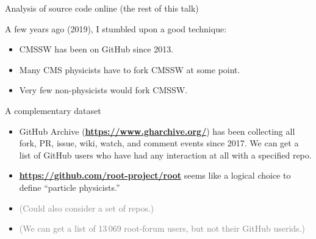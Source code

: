 \documentclass[aspectratio=169]{beamer}
\begin{document}
\begin{frame}{Analysis of source code online (the rest of this talk)}
\vspace{0.5 cm}

A few years ago (2019), I stumbled upon a good technique:

\vspace{0.2 cm}
\begin{itemize}
\item CMSSW has been on GitHub since 2013.
\item Many CMS physicists have to fork CMSSW at some point.
\item Very few non-physicists would fork CMSSW.
\end{itemize}

\vspace{0.2 cm}

\vspace{1 cm}
\end{frame}

\begin{frame}{A complementary dataset}
\vspace{0.5 cm}
\vspace{\baselineskip}

\begin{itemize}
\item GitHub Archive (\textcolor{blue}{\small\bf\url{https://www.gharchive.org/}}) has been collecting all fork, PR, issue, wiki, watch, and comment events since 2017. We can get a list of GitHub users who have had any interaction at all with a specified repo.
\item \textcolor{blue}{\small\bf\url{https://github.com/root-project/root}} seems like a logical choice to define ``particle physicists.''
\item \textcolor{gray}{(Could also consider a set of repos.)}
\item \textcolor{gray}{(We can get a list of 13\,069 root-forum users, but not their GitHub userids.)}
\end{itemize}

\vspace{0.2 cm}

\vspace{0.5 cm}
\end{frame}
\end{document}
